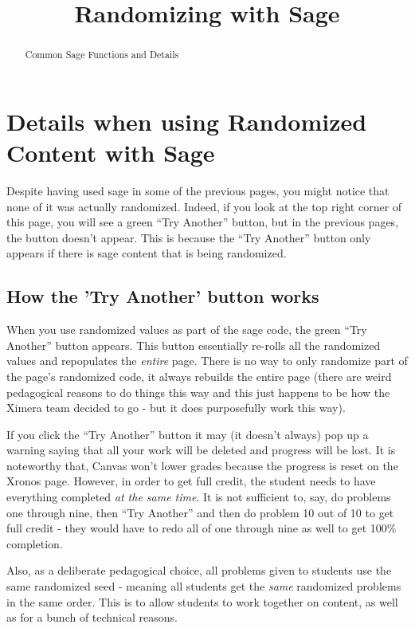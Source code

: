 \documentclass{ximera}
\title{Randomizing with Sage}
\begin{document}
\begin{abstract}
     Common Sage Functions and Details
\end{abstract}
\maketitle

\section{Details when using Randomized Content with Sage}
    Despite having used sage in some of the previous pages, you might notice that none of it was actually randomized. Indeed, if you look at the top right corner of this page, you will see a green ``Try Another'' button, but in the previous pages, the button doesn't appear. This is because the ``Try Another'' button only appears if there is sage content that is being randomized.
    
    \subsection{How the 'Try Another' button works}
        When you use randomized values as part of the sage code, the green ``Try Another'' button appears. This button essentially re-rolls all the randomized values and repopulates the \textit{entire} page. There is no way to only randomize part of the page's randomized code, it always rebuilds the entire page (there are weird pedagogical reasons to do things this way and this just happens to be how the Ximera team decided to go - but it does purposefully work this way).
        
        If you click the ``Try Another'' button it may (it doesn't always) pop up a warning saying that all your work will be deleted and progress will be lost. It is noteworthy that, Canvas won't lower grades because the progress is reset on the Xronos page. However, in order to get full credit, the student needs to have everything completed \textit{at the same time}. It is not sufficient to, say, do problems one through nine, then ``Try Another'' and then do problem 10 out of 10 to get full credit - they would have to redo all of one through nine as well to get 100\% completion.
        
        Also, as a deliberate pedagogical choice, all problems given to students use the same randomized seed - meaning all students get the \textit{same} randomized problems in the same order. This is to allow students to work together on content, as well as for a bunch of technical reasons.
\end{document}
